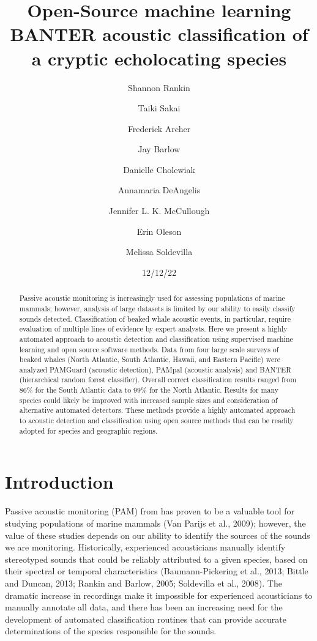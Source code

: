 \documentclass[
  letterpaper,
  DIV=11,
  numbers=noendperiod]{scrartcl}
\title{Open-Source machine learning BANTER acoustic classification of a
cryptic echolocating species}
\author{Shannon Rankin \and Taiki Sakai \and Frederick Archer \and Jay
Barlow \and Danielle Cholewiak \and Annamaria DeAngelis \and Jennifer L.
K. McCullough \and Erin Oleson \and Melissa Soldevilla}
\date{12/12/22}
\begin{document}
\maketitle
\begin{abstract}
Passive acoustic monitoring is increasingly used for assessing
populations of marine mammals; however, analysis of large datasets is
limited by our ability to easily classify sounds detected.
Classification of beaked whale acoustic events, in particular, require
evaluation of multiple lines of evidence by expert analysts. Here we
present a highly automated approach to acoustic detection and
classification using supervised machine learning and open source
software methods. Data from four large scale surveys of beaked whales
(North Atlantic, South Atlantic, Hawaii, and Eastern Pacific) were
analyzed PAMGuard (acoustic detection), PAMpal (acoustic analysis) and
BANTER (hierarchical random forest classifier). Overall correct
classification results ranged from 86\% for the South Atlantic data to
99\% for the North Atlantic. Results for many species could likely be
improved with increased sample sizes and consideration of alternative
automated detectors. These methods provide a highly automated approach
to acoustic detection and classification using open source methods that
can be readily adopted for species and geographic regions.
\end{abstract}
\ifdefined\Shaded\renewenvironment{Shaded}{\begin{tcolorbox}[boxrule=0pt, sharp corners, borderline west={3pt}{0pt}{shadecolor}, interior hidden, breakable, enhanced, frame hidden]}{\end{tcolorbox}}\fi

\hypertarget{introduction}{%
\section{Introduction}\label{introduction}}

Passive acoustic monitoring (PAM) from has proven to be a valuable tool
for studying populations of marine mammals (Van Parijs et al., 2009);
however, the value of these studies depends on our ability to identify
the sources of the sounds we are monitoring. Historically, experienced
acousticians manually identify stereotyped sounds that could be reliably
attributed to a given species, based on their spectral or temporal
characteristics (Baumann-Pickering et al., 2013; Bittle and Duncan,
2013; Rankin and Barlow, 2005; Soldevilla et al., 2008). The dramatic
increase in recordings make it impossible for experienced acousticians
to manually annotate all data, and there has been an increasing need for
the development of automated classification routines that can provide
accurate determinations of the species responsible for the sounds.
\end{document}
